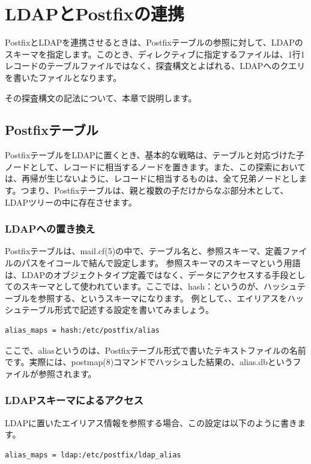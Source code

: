 \chapter{LDAPとPostfixの連携}

PostfixとLDAPを連携させるときは、Postfixテーブルの参照に対して、LDAPのスキーマを指定します。このとき、ディレクティブに指定するファイルは、1行1レコードのテーブルファイルではなく、探査構文とよばれる、LDAPへのクエリを書いたファイルとなります。

その探査構文の記法について、本章で説明します。

\section{Postfixテーブル}

PostfixテーブルをLDAPに置くとき、基本的な戦略は、テーブルと対応づけた子ノードとして、レコードに相当するノードを置きます。また、この探索においては、再帰が生じないように、レコードに相当するものは、全て兄弟ノードとします。つまり、Postfixテーブルは、親と複数の子だけからなぶ部分木として、LDAPツリーの中に存在させます。

\subsection{LDAPへの置き換え}
Postfixテーブルは、mail.cf(5)の中で、テーブル名と、参照スキーマ、定義ファイルのパスをイコールで結んで設定します。
参照スキーマのスキーマという用語は、LDAPのオブジェクトタイプ定義ではなく、データにアクセスする手段としてのスキーマとして使われています。ここでは、hash：というのが、ハッシュテーブルを参照する、というスキーマになります。
例として、、エイリアスをハッシュテーブル形式で記述する設定を書いてみましょう。

\begin{verbatim}
alias_maps = hash:/etc/postfix/alias
\end{verbatim}

ここで、aliasというのは、Postfixテーブル形式で書いたテキストファイルの名前です。実際には、postmap(8)コマンドでハッシュした結果の、alias.dbというファイルが参照されます。

\subsection{LDAPスキーマによるアクセス}

LDAPに置いたエイリアス情報を参照する場合、この設定は以下のように書きます。

\begin{verbatim}
alias_maps = ldap:/etc/postfix/ldap_alias
\end{verbatim}

